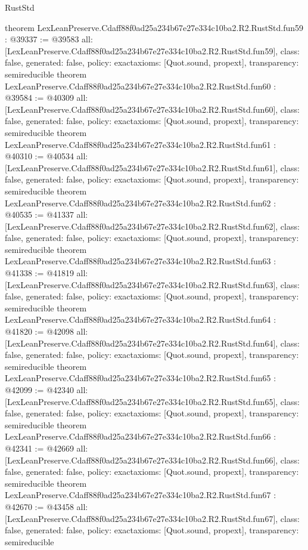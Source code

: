 \begin{lexlean}{RustStd}
\begin{coremodule}
{}
theorem LexLeanPreserve.Cdaff88f0ad25a234b67e27e334c10ba2.R2.RustStd.fun59 : @39337 := @39583 {
  all: [LexLeanPreserve.Cdaff88f0ad25a234b67e27e334c10ba2.R2.RustStd.fun59],
  class: false,
  generated: false,
  policy: exact{axioms: [Quot.sound, propext]},
  transparency: semireducible
}
theorem LexLeanPreserve.Cdaff88f0ad25a234b67e27e334c10ba2.R2.RustStd.fun60 : @39584 := @40309 {
  all: [LexLeanPreserve.Cdaff88f0ad25a234b67e27e334c10ba2.R2.RustStd.fun60],
  class: false,
  generated: false,
  policy: exact{axioms: [Quot.sound, propext]},
  transparency: semireducible
}
theorem LexLeanPreserve.Cdaff88f0ad25a234b67e27e334c10ba2.R2.RustStd.fun61 : @40310 := @40534 {
  all: [LexLeanPreserve.Cdaff88f0ad25a234b67e27e334c10ba2.R2.RustStd.fun61],
  class: false,
  generated: false,
  policy: exact{axioms: [Quot.sound, propext]},
  transparency: semireducible
}
theorem LexLeanPreserve.Cdaff88f0ad25a234b67e27e334c10ba2.R2.RustStd.fun62 : @40535 := @41337 {
  all: [LexLeanPreserve.Cdaff88f0ad25a234b67e27e334c10ba2.R2.RustStd.fun62],
  class: false,
  generated: false,
  policy: exact{axioms: [Quot.sound, propext]},
  transparency: semireducible
}
theorem LexLeanPreserve.Cdaff88f0ad25a234b67e27e334c10ba2.R2.RustStd.fun63 : @41338 := @41819 {
  all: [LexLeanPreserve.Cdaff88f0ad25a234b67e27e334c10ba2.R2.RustStd.fun63],
  class: false,
  generated: false,
  policy: exact{axioms: [Quot.sound, propext]},
  transparency: semireducible
}
theorem LexLeanPreserve.Cdaff88f0ad25a234b67e27e334c10ba2.R2.RustStd.fun64 : @41820 := @42098 {
  all: [LexLeanPreserve.Cdaff88f0ad25a234b67e27e334c10ba2.R2.RustStd.fun64],
  class: false,
  generated: false,
  policy: exact{axioms: [Quot.sound, propext]},
  transparency: semireducible
}
theorem LexLeanPreserve.Cdaff88f0ad25a234b67e27e334c10ba2.R2.RustStd.fun65 : @42099 := @42340 {
  all: [LexLeanPreserve.Cdaff88f0ad25a234b67e27e334c10ba2.R2.RustStd.fun65],
  class: false,
  generated: false,
  policy: exact{axioms: [Quot.sound, propext]},
  transparency: semireducible
}
theorem LexLeanPreserve.Cdaff88f0ad25a234b67e27e334c10ba2.R2.RustStd.fun66 : @42341 := @42669 {
  all: [LexLeanPreserve.Cdaff88f0ad25a234b67e27e334c10ba2.R2.RustStd.fun66],
  class: false,
  generated: false,
  policy: exact{axioms: [Quot.sound, propext]},
  transparency: semireducible
}
theorem LexLeanPreserve.Cdaff88f0ad25a234b67e27e334c10ba2.R2.RustStd.fun67 : @42670 := @43458 {
  all: [LexLeanPreserve.Cdaff88f0ad25a234b67e27e334c10ba2.R2.RustStd.fun67],
  class: false,
  generated: false,
  policy: exact{axioms: [Quot.sound, propext]},
  transparency: semireducible
}
\end{coremodule}
\end{lexlean}
